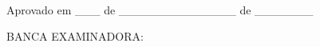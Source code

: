 \begin{folhadeaprovacao}
\vspace*{\fill}
\begin{center}
    {\MakeUppercase{\imprimirautor}} 
    \vspace*{\fill}
    \begin{center}
      \imprimirtitulo \\
    \end{center}
    \vspace*{\fill}
  \end{center}
  \hspace*{\fill}\parbox[b]{.5\textwidth}{%
    \linespread{1}\selectfont
    \imprimirpreambulo
}

\vspace*{\fill}
    \begin{flushleft}
   Aprovado em \_\_\_ de \_\_\_\_\_\_\_\_\_\_\_\_\_\_ de \_\_\_\_\_\_\_
  \par
  \vspace*{\fill}

BANCA EXAMINADORA:
\end{flushleft}

  \vspace*{\fill}
   \vspace*{\onelineskip}
   \vspace*{\onelineskip}
\vspace*{\fill}
\end{folhadeaprovacao}
